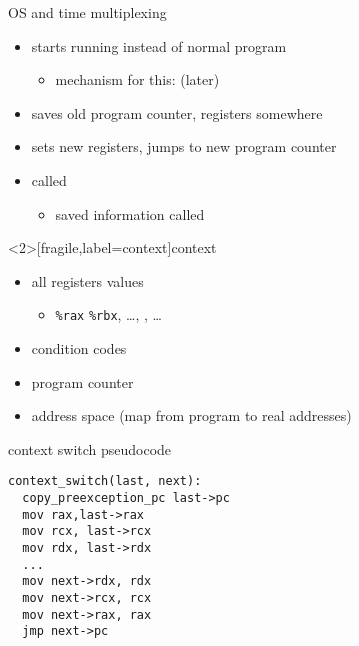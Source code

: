 \usetikzlibrary{arrows.meta,calc,positioning,matrix,patterns}


\begin{frame}{OS and time multiplexing}
\begin{itemize}
\item starts running instead of normal program
    \begin{itemize}
    \item mechanism for this:  (later)
    \end{itemize}
\item saves old program counter, registers somewhere
\item sets new registers, jumps to new program counter
\item called 
    \begin{itemize}
    \item saved information called 
    \end{itemize}
\end{itemize}
\end{frame}

\begin{frame}<2>[fragile,label=context]{context}
\begin{itemize}
\item all registers values
    \begin{itemize}
        \item \lstinline|%rax| \lstinline|%rbx|, \ldots, , \ldots
    \end{itemize}
\item condition codes
\item program counter
\item address space (map from program to real addresses)
\end{itemize}
\end{frame}

\begin{frame}[fragile,label=ctxtSwitchPseudo]{context switch pseudocode}
\begin{lstlisting}
context_switch(last, next):
  copy_preexception_pc last->pc
  mov rax,last->rax 
  mov rcx, last->rcx 
  mov rdx, last->rdx
  ...
  mov next->rdx, rdx
  mov next->rcx, rcx
  mov next->rax, rax
  jmp next->pc
\end{lstlisting}
\end{frame}

